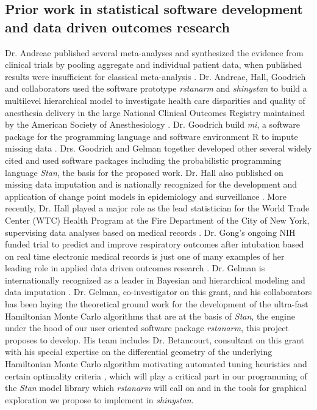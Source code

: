 \documentclass[11pt,notitlepage]{article}
\begin{document}
\subsection*{Prior work in statistical software development and data driven outcomes research} Dr. Andreae published several meta-analyses and synthesized the evidence 
from clinical trials by pooling aggregate and individual patient data, when 
published results were insufficient for classical meta-analysis 
\cite{AndreaeJohnsonAbstract2013, Andreae2013, Andreae2015, Carter2015, Atchabahian2015}. Dr. Andreae, Hall, Goodrich and collaborators used the software 
prototype \textit{rstanarm} and \textit{shinystan} to build a multilevel 
hierarchical model to investigate health care disparities and quality of 
anesthesia delivery in the large National Clinical Outcomes Registry maintained 
by the American Society of Anesthesiology \cite{AndreaeWhite2015}. Dr. Goodrich 
build \textit{mi}, a software package for the programming language and 
software environment R to impute missing data \cite{miCRAN}. Drs. Goodrich 
and Gelman together developed other several widely cited and used software packages including the probabilistic programming language \textit{Stan}\cite{Stan_Software_2014}, 
the basis for the proposed work. Dr. Hall also published on missing data 
imputation \cite{Hall2009a, Wang_20029935, Wang_20029935} and is nationally 
recognized for the development and application of change point models in 
epidemiology and surveillance 
\cite{Hall2000, Hall2001, Hall2003bayesian, Hall2009, Hall2015}. 
More recently, Dr. Hall played a major role as the lead statistician 
for the World Trade Center (WTC) Health Program at the Fire Department 
of the City of New York, supervising data analyses based on medical 
records \cite{Aldrich2010, Hall2015, Zeig-Owens2011}.  
Dr. Gong's ongoing NIH funded trial to predict and improve 
respiratory outcomes after intubation based on real time 
electronic medical records is just one of many examples of her 
leading role in applied data driven outcomes research 
\cite{Gong2005, Gong2010, Gajic2011, Yu_24970344, Kor2014}. 
Dr. Gelman is internationally recognized as a leader in Bayesian and hierarchical 
modeling and data imputation 
\cite{Gelman1998notasked, Gelman2001imputation, Hoffman2014, Gelman-Hill_2014}. 
Dr. Gelman, co-investigator on this grant, and his collaborators has been laying the 
theoretical ground work for the development of the ultra-fast Hamiltonian 
Monte Carlo algorithms \cite{Hoffman2014,Stan_Software_2014} 
that are at the basis of \textit{Stan}, the engine 
under the hood of our user oriented software package \textit{rstanarm}, 
this project proposes to develop. His team includes Dr. Betancourt, 
consultant on this grant with his special expertise on the differential 
geometry of the underlying Hamiltonian Monte Carlo algorithm
motivating automated tuning heuristics and certain optimality criteria 
\cite{BetancourtGeometry2016}, which will play a 
critical part in our programming of the \textit{Stan} model library 
which \textit{rstanarm} will call on and in the tools for graphical exploration
we propose to implement in \textit{shinystan}.
\end{document}
